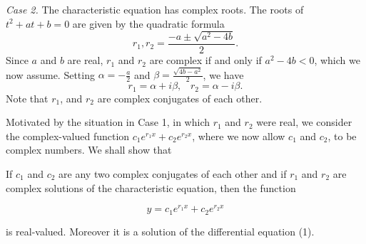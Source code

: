 \textit{Case 2.} The characteristic equation has complex roots. The roots of $t^2 + at + b = 0$ 
are given by the quadratic formula
$$
r_{1}, r_{2} = \frac{-a \pm \sqrt{a^2 - 4b}}{2}.
$$
\noindent Since $a$ and $b$ are real, $r_1$ and $r_2$ are complex if and only if $a^2 - 4b < 0$, which we now assume.  Setting $\alpha = - \frac{a}{2}$ and $\beta = \frac{\sqrt{4b - a^2}}{2}$, 
we have
$$
r_1 = \alpha + i\beta, \;\;\;  r_2 = \alpha - i\beta.
$$
\noindent Note that $r_1$, and $r_2$ are complex conjugates of each other.

Motivated by the situation in Case 1, in which $r_1$ and $r_2$ were real, we consider the 
complex-valued function $c_{1}e^{r_{1}x} + c_{2}e^{r_{2}x}$, where we now allow $c_1$ 
and $c_2$, to be complex numbers. We shall show that

\begin{theorem} %
If $c_1$ and $c_2$ are any two complex conjugates of each other and if $r_1$ and $r_2$ 
are complex solutions of the characteristic equation, then the function 

$$
y = c_{1}e^{r_{1}x} + c_{2}e^{r_{2}x}
$$

\noindent is real-valued.  Moreover it is a solution of the differential equation (1).
\end{theorem}


